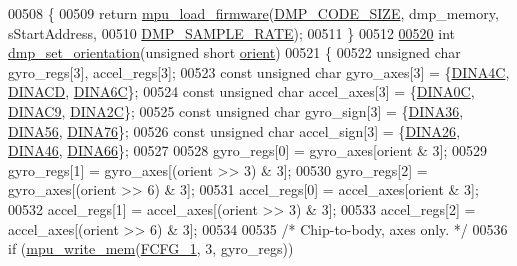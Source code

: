 \begin{DoxyCode}
00508 \{
00509     \textcolor{keywordflow}{return} \hyperlink{group___d_r_i_v_e_r_s_ga8fbdfe1a50285d4ab438e29c2efc70f5}{mpu\_load\_firmware}(\hyperlink{group___d_r_i_v_e_r_s_ga304702b72a030fceea30b45d1ab53a5c}{DMP\_CODE\_SIZE}, dmp\_memory, sStartAddress,
00510         \hyperlink{group___d_r_i_v_e_r_s_ga9d0f0425cbcb58186500cb8686e41e67}{DMP\_SAMPLE\_RATE});
00511 \}
00512 
\hypertarget{inv__mpu__dmp__motion__driver_8c_source.tex_l00520}{}\hyperlink{group___d_r_i_v_e_r_s_ga6cb5ff144ce6e1546f00809de8bb24a4}{00520} \textcolor{keywordtype}{int} \hyperlink{group___d_r_i_v_e_r_s_ga6cb5ff144ce6e1546f00809de8bb24a4}{dmp\_set\_orientation}(\textcolor{keywordtype}{unsigned} \textcolor{keywordtype}{short} \hyperlink{structdmp__s_ac949b11ebfe17c3a2ac42785a1437c25}{orient})
00521 \{
00522     \textcolor{keywordtype}{unsigned} \textcolor{keywordtype}{char} gyro\_regs[3], accel\_regs[3];
00523     \textcolor{keyword}{const} \textcolor{keywordtype}{unsigned} \textcolor{keywordtype}{char} gyro\_axes[3] = \{\hyperlink{dmp_key_8h_a9b27e6d8cc2695be889396deba983c68}{DINA4C}, \hyperlink{dmp_key_8h_a42a4b57f7ce73c019a5456aed0777ae2}{DINACD}, \hyperlink{dmp_key_8h_a7b67d759acd8c51da25770cea5909bfc}{DINA6C}\};
00524     \textcolor{keyword}{const} \textcolor{keywordtype}{unsigned} \textcolor{keywordtype}{char} accel\_axes[3] = \{\hyperlink{dmp_key_8h_ae5613957164ac19bde823e6e03857f95}{DINA0C}, \hyperlink{dmp_key_8h_abf1781aef14b0bf60cede867717c0acb}{DINAC9}, \hyperlink{dmp_key_8h_a167b76fbcef1ddcd2535deaa5716e75a}{DINA2C}\};
00525     \textcolor{keyword}{const} \textcolor{keywordtype}{unsigned} \textcolor{keywordtype}{char} gyro\_sign[3] = \{\hyperlink{dmp_key_8h_a3bf2a77c13703721c9908a2f0427aa51}{DINA36}, \hyperlink{dmp_key_8h_ad99c60f48e726f6b1b1a0b5dd8ef0b2a}{DINA56}, \hyperlink{dmp_key_8h_a2d212a13b747010ba331de74d408fce6}{DINA76}\};
00526     \textcolor{keyword}{const} \textcolor{keywordtype}{unsigned} \textcolor{keywordtype}{char} accel\_sign[3] = \{\hyperlink{dmp_key_8h_ab20b98c1b6b4a1826769b8ff3e2b559d}{DINA26}, \hyperlink{dmp_key_8h_a8b9b8c9cc6e238b2a63696e7fe73b312}{DINA46}, \hyperlink{dmp_key_8h_a99ecf6ce38fef8eabcf7f618f37f5f88}{DINA66}\};
00527 
00528     gyro\_regs[0] = gyro\_axes[orient & 3];
00529     gyro\_regs[1] = gyro\_axes[(orient >> 3) & 3];
00530     gyro\_regs[2] = gyro\_axes[(orient >> 6) & 3];
00531     accel\_regs[0] = accel\_axes[orient & 3];
00532     accel\_regs[1] = accel\_axes[(orient >> 3) & 3];
00533     accel\_regs[2] = accel\_axes[(orient >> 6) & 3];
00534 
00535     \textcolor{comment}{/* Chip-to-body, axes only. */}
00536     \textcolor{keywordflow}{if} (\hyperlink{group___d_r_i_v_e_r_s_gafea59910bc3dd30ba3356b1c75213a5f}{mpu\_write\_mem}(\hyperlink{group___d_r_i_v_e_r_s_ga9a7d63d6add8f9fdf9edc722a01aeb92}{FCFG\_1}, 3, gyro\_regs))

\end{DoxyCode}
